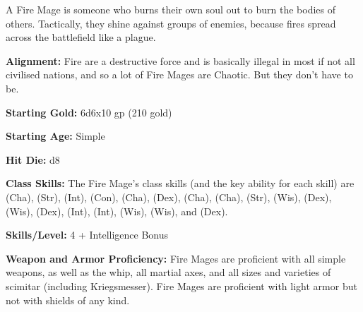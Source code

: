 
A Fire Mage is someone who burns their own soul out to burn the bodies of others. Tactically, they shine against groups of enemies, because fires spread across the battlefield like a plague.

\textbf{Alignment:} Fire are a destructive force and is basically illegal in most if not all civilised nations, and so a lot of Fire Mages are Chaotic. But they don't have to be.

\textbf{Starting Gold:} 6d6x10 gp (210 gold)

\textbf{Starting Age:} Simple

\textbf{Hit Die:} d8

\textbf{Class Skills:} The Fire Mage's class skills (and the key ability for each skill) are  (Cha),  (Str),  (Int),  (Con),  (Cha),  (Dex),  (Cha),  (Cha),  (Str),  (Wis),  (Dex),  (Wis),  (Dex),  (Int),  (Int),  (Wis),  (Wis), and  (Dex).

\textbf{Skills/Level:} 4 + Intelligence Bonus

\modebab{}
\goodfor{}
\goodref{}
\goodwil{}

\begin{classtable}
\end{classtable}

\classfeatures

\textbf{Weapon and Armor Proficiency:} Fire Mages are proficient with all simple weapons, as well as the whip, all martial axes, and all sizes and varieties of scimitar (including Kriegsmesser). Fire Mages are proficient with light armor but not with shields of any kind.

